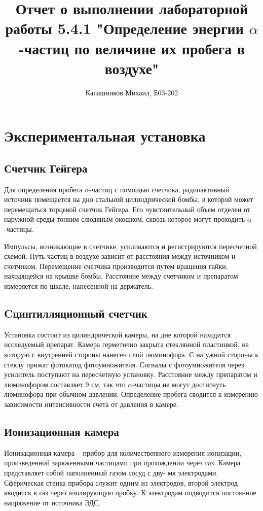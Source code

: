 \documentclass[14pt, a4paper]{report}
\title{\textbf{Отчет о выполнении лабораторной работы 5.4.1 "Определение энергии $\alpha$-частиц по величине их пробега в воздухе"}}
\author{Калашников Михаил, Б03-202}
\date{}
\begin{document}
\maketitle


\section{Экспериментальная установка}

\subsection{Счетчик Гейгера}

Для определения пробега $\alpha$-частиц с помощью счетчика, радиоактивный источник помещается на дно стальной цилиндрической бомбы, в которой может перемещаться торцевой счетчик Гейгера. Его чувствительный объем отделен от наружной среды тонким слюдяным окошком, сквозь которое могут проходить $\alpha$-частицы.

Импульсы, возникающие в счетчике, усиливаются и регистрируются пересчетной схемой. Путь частиц в воздухе зависит от расстояния между источником и счетчиком. Перемещение счетчика производится путем вращения гайки, находящейся на крышке бомбы. Расстояние между счетчиком и препаратом измеряется по шкале, нанесенной на держатель.

\subsection{Cцинтилляционный счетчик}

Установка состоит из цилиндрической камеры, на дне которой находится исследуемый препарат. Камера герметично закрыта
стеклянной пластинкой, на которую с внутренней стороны нанесен слой люминофора. С на ужной стороны к стеклу прижат
фотокатод фотоумножителя. Сигналы с фотоумножителя через усилитель поступают на пересчетную установку. Расстояние между
препаратом и люминофором составляет 9 см, так что $\alpha$-частицы не могут достигнуть люминофора при обычном давлении.
Определение пробега сводится к измерению зависимости интенсивности счета от давления в камере.

\subsection{Ионизационная камера}

Ионизационная камера -- прибор для количественного измерения ионизации, произведенной заряженными частицами при прохождении через газ. Камера представляет собой наполненный газом сосуд с дву-
мя электродами. Сферическая стенка прибора служит одним из электродов, второй электрод вводится в газ через изолирующую пробку. К электродам подводится постоянное напряжение от источника ЭДС. 
\end{document}
